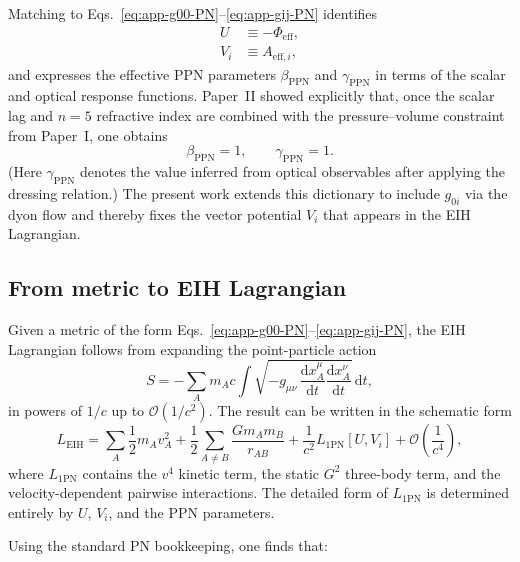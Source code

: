 \documentclass[11pt]{article}
\newcommand{\PN}{\mathrm{PN}}
\newcommand{\dd}{\mathrm{d}}
\begin{document}
Matching to Eqs.~\eqref{eq:app-g00-PN}--\eqref{eq:app-gij-PN}
identifies
\begin{align}
  U &\equiv -\Phi_{\text{eff}},
  \\
  V_i &\equiv A_{\text{eff},i},
\end{align}
 and expresses the effective PPN parameters $\beta_{\mathrm{PPN}}$
and $\gamma_{\mathrm{PPN}}$ in terms of the scalar and optical
response functions.
Paper~II showed explicitly that, once the scalar lag and $n=5$
refractive index are combined with the pressure--volume constraint
from Paper~I, one obtains
\begin{equation}
  \beta_{\mathrm{PPN}} = 1,
  \qquad
  \gamma_{\mathrm{PPN}} = 1.
\end{equation}
(Here $\gamma_{\mathrm{PPN}}$ denotes the value inferred from optical
observables after applying the dressing relation.)
The present work extends this dictionary to include $g_{0i}$ via the
dyon flow and thereby fixes the vector potential $V_i$ that appears
in the EIH Lagrangian.

\subsection{From metric to EIH Lagrangian}

Given a metric of the form
Eqs.~\eqref{eq:app-g00-PN}--\eqref{eq:app-gij-PN}, the
EIH Lagrangian follows from expanding the point-particle action
\begin{equation}
  S
  = -\sum_A m_A c
      \int \sqrt{-g_{\mu\nu}\,
                  \frac{\dd x_A^\mu}{\dd t}
                  \frac{\dd x_A^\nu}{\dd t}}\,
           \dd t,
\end{equation}
in powers of $1/c$ up to $\mathcal{O}(1/c^2)$.
The result can be written in the schematic form
\begin{equation}
  L_{\text{EIH}}
  = \sum_A \frac{1}{2} m_A v_A^2
    + \frac{1}{2}\sum_{A\neq B}
       \frac{G m_A m_B}{r_{AB}}
    + \frac{1}{c^2} L_{1\PN}[U,V_i]
    + \mathcal{O}\!\left(\frac{1}{c^4}\right),
\end{equation}
where $L_{1\PN}$ contains the $v^4$ kinetic term, the static $G^2$
three-body term, and the velocity-dependent pairwise interactions.
The detailed form of $L_{1\PN}$ is determined entirely by $U$,
$V_i$, and the PPN parameters.

Using the standard PN bookkeeping, one finds that:
\end{document}
